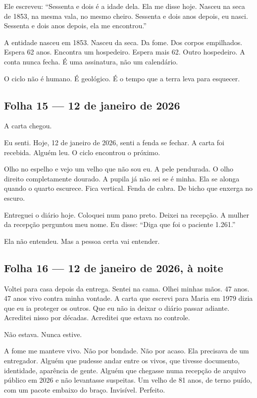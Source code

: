 \noindent Ele escreveu: ``Sessenta e dois é a idade dela. Ela me disse hoje. Nasceu na seca de 1853, na mesma vala, no mesmo cheiro. Sessenta e dois anos depois, eu nasci. Sessenta e dois anos depois, ela me encontrou.''

\noindent A entidade nasceu em 1853. Nasceu da seca. Da fome. Dos corpos empilhados. Espera 62 anos. Encontra um hospedeiro. Espera mais 62. Outro hospedeiro. A conta nunca fecha. É uma assinatura, não um calendário.

\noindent O ciclo não é humano. É geológico. É o tempo que a terra leva para esquecer.

\subsection*{Folha 15 --- 12 de janeiro de 2026}

\noindent A carta chegou.

\noindent Eu senti. Hoje, 12 de janeiro de 2026, senti a fenda se fechar. A carta foi recebida. Alguém leu. O ciclo encontrou o próximo.

\noindent Olho no espelho e vejo um velho que não sou eu. A pele pendurada. O olho direito completamente dourado. A pupila já não sei se é minha. Ela se alonga quando o quarto escurece. Fica vertical. Fenda de cabra. De bicho que enxerga no escuro.

\noindent Entreguei o diário hoje. Coloquei num pano preto. Deixei na recepção. A mulher da recepção perguntou meu nome. Eu disse: ``Diga que foi o paciente 1.261.''

\noindent Ela não entendeu. Mas a pessoa certa vai entender.

\subsection*{Folha 16 --- 12 de janeiro de 2026, à noite}

\noindent Voltei para casa depois da entrega. Sentei na cama. Olhei minhas mãos. 47 anos. 47 anos vivo contra minha vontade. A carta que escrevi para Maria em 1979 dizia que eu ia proteger os outros. Que eu não ia deixar o diário passar adiante. Acreditei nisso por décadas. Acreditei que estava no controle.

\noindent Não estava. Nunca estive.

\noindent A fome me manteve vivo. Não por bondade. Não por acaso. Ela precisava de um entregador. Alguém que pudesse andar entre os vivos, que tivesse documento, identidade, aparência de gente. Alguém que chegasse numa recepção de arquivo público em 2026 e não levantasse suspeitas. Um velho de 81 anos, de terno puído, com um pacote embaixo do braço. Invisível. Perfeito.

